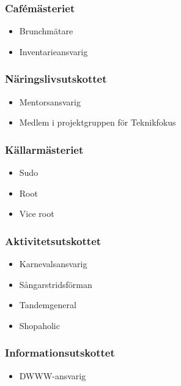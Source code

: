 \documentclass{dsekprotokoll}
\begin{document}
\begin{multicols}{2}

    \subsubsection*{Cafémästeriet}
    \begin{itemize}
        \item Brunchmätare
        \item Inventarieansvarig
    \end{itemize}

    \subsubsection*{Näringslivsutskottet}
    \begin{itemize}
        \item Mentorsansvarig
        \item Medlem i projektgruppen för Teknikfokus
    \end{itemize}

    \subsubsection*{Källarmästeriet}
    \begin{itemize}
        \item Sudo
        \item Root
        \item Vice root
    \end{itemize}

    \subsubsection*{Aktivitetsutskottet}
    \begin{itemize}
        \item Karnevalsansvarig
        \item Sångarstridsförman
        \item Tandemgeneral
        \item Shopaholic
    \end{itemize}

    \subsubsection*{Informationsutskottet}
    \begin{itemize}
        \item DWWW-ansvarig
    \end{itemize}


\end{multicols}
\end{document}
